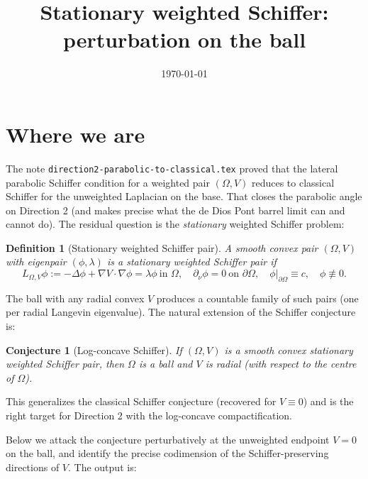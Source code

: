 \documentclass[11pt]{article}
\title{Stationary weighted Schiffer: perturbation on the ball}
\author{}
\date{\today}
\newcommand{\Om}{\Omega}
\newcommand{\1}{\mathbf 1}
\newcommand{\nor}{\partial_\nu}
\newtheorem{conj}[lem]{Conjecture}
\newtheorem{defn}[lem]{Definition}
\begin{document}
\maketitle

\section{Where we are}

The note \texttt{direction2-parabolic-to-classical.tex} proved that
the lateral parabolic Schiffer condition for a weighted pair
$(\Om,V)$ reduces to classical Schiffer for the unweighted Laplacian
on the base. That closes the parabolic angle on Direction 2 (and
makes precise what the de Dios Pont barrel limit can and cannot do).
The residual question is the \emph{stationary} weighted Schiffer
problem:

\begin{defn}[Stationary weighted Schiffer pair]\label{def:wsp}
A smooth convex pair $(\Om,V)$ with eigenpair $(\phi,\lambda)$
is a \emph{stationary weighted Schiffer pair} if
\begin{equation}\label{eq:swsp}
    L_{\Om,V}\phi := -\Delta\phi+\nabla V\cdot\nabla\phi=\lambda\phi
    \ \text{in }\Om,\quad
    \nor\phi=0\ \text{on }\partial\Om,\quad
    \phi|_{\partial\Om}\equiv c,\quad \phi\not\equiv 0.
\end{equation}
\end{defn}

The ball with any radial convex $V$ produces a countable family of
such pairs (one per radial Langevin eigenvalue). The natural
extension of the Schiffer conjecture is:

\begin{conj}[Log-concave Schiffer]\label{conj:lcs}
If $(\Om,V)$ is a smooth convex stationary weighted Schiffer pair,
then $\Om$ is a ball and $V$ is radial (with respect to the centre of
$\Om$).
\end{conj}

This generalizes the classical Schiffer conjecture (recovered for
$V\equiv 0$) and is the right target for Direction 2 with the
log-concave compactification.

Below we attack the conjecture perturbatively at the unweighted
endpoint $V=0$ on the ball, and identify the precise codimension of
the Schiffer-preserving directions of $V$. The output is:
\end{document}
